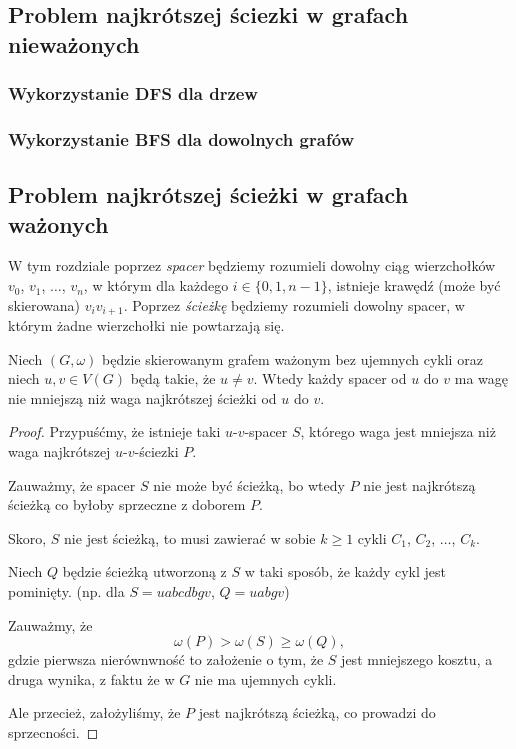 \subsection{Problem najkrótszej ściezki w grafach nieważonych}
\subsubsection{Wykorzystanie DFS dla drzew}
\subsubsection{Wykorzystanie BFS dla dowolnych grafów}

\subsection{Problem najkrótszej ścieżki w grafach ważonych}

W tym rozdziale poprzez \textit{spacer} będziemy rozumieli dowolny
ciąg wierzchołków $v_0$, $v_1$, $\dots$, $v_{n}$, w 
którym dla każdego $i \in \{0, 1, n-1\}$,
istnieje krawędź (może być skierowana)
$v_iv_{i+1}$. Poprzez \textit{ścieżkę}
będziemy rozumieli dowolny spacer, w którym
żadne wierzchołki nie powtarzają się.

\begin{lemma}
	Niech $(G,\omega)$ będzie skierowanym grafem ważonym 
	bez ujemnych cykli oraz niech $u,v \in V(G)$ będą
	takie, że $u \neq v$. Wtedy
	każdy spacer od $u$ do $v$ ma wagę nie 
	mniejszą niż waga
	najkrótszej ścieżki od $u$ do $v$.
	\begin{proof}
		Przypuśćmy, że istnieje taki $u$-$v$-spacer $S$, 
		którego waga jest mniejsza niż waga najkrótszej
		$u$-$v$-ściezki $P$. 
		
		Zauważmy, że spacer $S$ nie może być ścieżką, 
		bo wtedy $P$ nie jest najkrótszą ścieżką co 
		byłoby sprzeczne z doborem $P$.
		
		Skoro, $S$ nie jest ścieżką, to musi zawierać
		w sobie $k\geq 1$ cykli $C_1$, $C_2$, $\dots$, $C_k$. 
		
		Niech $Q$ będzie ścieżką utworzoną z $S$ w taki sposób,
		że każdy cykl jest pominięty. (np. dla $S=uabcdbgv$, 
		$Q=uabgv$)
		
		Zauważmy, że
		\[\omega(P) > \omega(S) \geq \omega(Q),\]
		gdzie pierwsza nierównwność to założenie o
		tym, że $S$ jest mniejszego kosztu, a druga wynika,
		z faktu że w $G$ nie ma ujemnych cykli.
		
		Ale przecież, założyliśmy, że $P$ jest najkrótszą ścieżką,
		co prowadzi do sprzecności.
		
	\end{proof}
	\label{minpath_walk}
\end{lemma}

